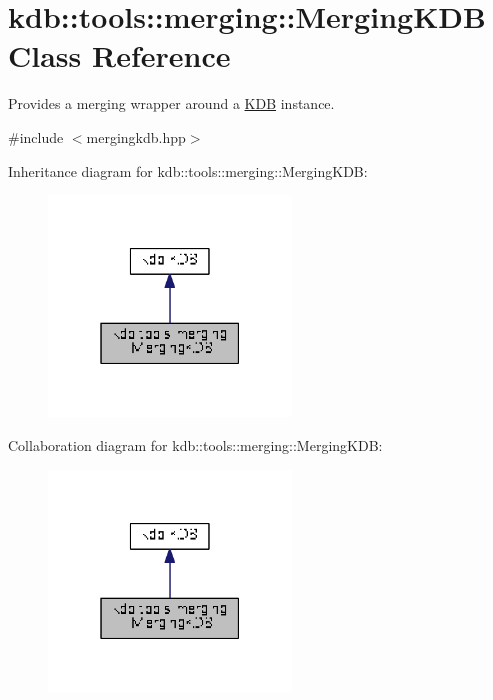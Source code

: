 \hypertarget{classkdb_1_1tools_1_1merging_1_1MergingKDB}{}\section{kdb\+:\+:tools\+:\+:merging\+:\+:Merging\+K\+DB Class Reference}
\label{classkdb_1_1tools_1_1merging_1_1MergingKDB}


Provides a merging wrapper around a \hyperlink{classkdb_1_1KDB}{K\+DB} instance.  




{\ttfamily \#include $<$mergingkdb.\+hpp$>$}



Inheritance diagram for kdb\+:\+:tools\+:\+:merging\+:\+:Merging\+K\+DB\+:
\nopagebreak
\begin{figure}[H]
\begin{center}
\leavevmode
\includegraphics[width=183pt]{classkdb_1_1tools_1_1merging_1_1MergingKDB__inherit__graph}
\end{center}
\end{figure}


Collaboration diagram for kdb\+:\+:tools\+:\+:merging\+:\+:Merging\+K\+DB\+:
\nopagebreak
\begin{figure}[H]
\begin{center}
\leavevmode
\includegraphics[width=183pt]{classkdb_1_1tools_1_1merging_1_1MergingKDB__coll__graph}
\end{center}
\end{figure}
